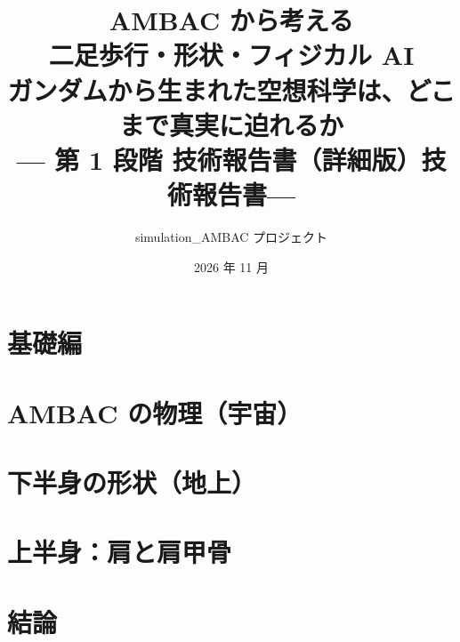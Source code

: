 \documentclass[paper=a4paper,fontsize=10.5pt,report,openany]{jlreq}
\title{\textbf{AMBAC から考える\\二足歩行・形状・フィジカル AI}\\[0.5em]
\large ガンダムから生まれた空想科学は、どこまで真実に迫れるか\\
--- 第 1 段階 \ifdetailed 技術報告書（詳細版）\else 技術報告書\fi ---}
\author{simulation\_AMBAC プロジェクト}
\date{2026 年 11 月}
\theoremstyle{definition}
\newcommand{\Detail}[1]{\ifdetailed\fi}
\begin{document}
\maketitle

\begin{abstract}

\end{abstract}

\tableofcontents
\Detail{notation}


\Detail{intro_detail}

\ifdetailed
\part{基礎編}



\fi

\part{AMBAC の物理（宇宙）}

\Detail{ch01}

\Detail{ch02}

\Detail{ch03}

\Detail{ch04}

\Detail{ch05}

\part{下半身の形状（地上）}

\Detail{ch06}

\Detail{ch09}

\Detail{ch10}

\part{上半身：肩と肩甲骨}

\Detail{ch07}

\Detail{ch08}

\part{結論}
\Detail{related}

\Detail{phase2}

\appendix



\Detail{glossary}
\Detail{app_more}
\Detail{answers}
\ifdetailed\fi


\end{document}
